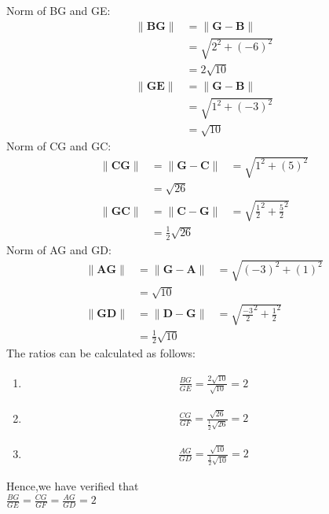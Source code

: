 \documentclass[journal,12pt,onecolumn]{IEEEtran}
\theoremstyle{remark}
\begin{document}
Norm of BG and GE:
\begin{align}
\|\mathbf{BG}\|&=\|\mathbf{G-B}\|\\
               &=\sqrt{2^2+(-6)^2}\\
               &=2\sqrt{10}\\
\|\mathbf{GE}\|&=\|\mathbf{G-B}\|\\
               &=\sqrt{1^2+(-3)^2}\\
               &=\sqrt{10}
\end{align}
Norm of CG and GC:\\
\begin{align}
\|\mathbf{CG}\|&=\|\mathbf{G-C}\|
               &=\sqrt{1^2+(5)^2}\\
               &=\sqrt{26}\\
\|\mathbf{GC}\|&=\|\mathbf{C-G}\|
               &=\sqrt{\frac{1}{2}^2+\frac{5}{2}^2}\\
               &=\frac{1}{2}\sqrt{26}
\end{align}
Norm of AG and GD:\\
\begin{align}
\|\mathbf{AG}\|&=\|\mathbf{G-A}\|
               &=\sqrt{(-3)^2+(1)^2}\\
               &=\sqrt{10}\\
\|\mathbf{GD}\|&=\|\mathbf{D-G}\|
               &=\sqrt{\frac{-3}{2}^2+\frac{1}{2}^2}\\
               &=\frac{1}{2}\sqrt{10}
\end{align}
The ratios can be calculated as follows:\\
\begin{enumerate} 
\item
\begin{align}
 \frac{BG}{GE} =\frac{2\sqrt{10}}{\sqrt{10}}=2
\end{align}
\item 
\begin{align}
 \frac{CG}{GF}=\frac{\sqrt{26}}{\frac{1}{2}\sqrt{26}}=2
\end{align}
\item 
\begin{align}
 \frac{AG}{GD}=\frac{\sqrt{10}}{\frac{1}{2}\sqrt{10}}=2
\end{align}
\end{enumerate}
Hence,we have verified that \\
$\frac{BG}{GE}=\frac{CG}{GF}=\frac{AG}{GD}=2$
\end{document}
